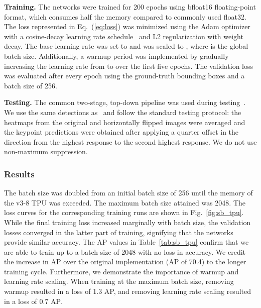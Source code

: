 \documentclass[final]{cvpr}
\begin{document}
\medskip\noindent\textbf{Training.} The networks were trained for 200 epochs using bfloat16 floating-point format, which consumes half the memory compared to commonly used float32. The loss represented in Eq.\ (\ref{eq:loss}) was minimized using the Adam optimizer~\cite{kingma2014adam} with a cosine-decay learning rate schedule~\cite{loshchilov2016sgdr} and L2 regularization with  weight decay. The base learning rate  was set to  and was scaled to , where  is the global batch size. Additionally, a warmup period was implemented by gradually increasing the learning rate from  to  over the first five epochs.  The validation loss was evaluated after every epoch using the ground-truth bounding boxes and a batch size of 256. 

\medskip\noindent\textbf{Testing.} The common two-stage, top-down pipeline was used during testing~\cite{chen2018cascaded, xiao2018simple, sun2019deep}. We use the same detections as~\cite{xiao2018simple, sun2019deep} and follow the standard testing protocol: the heatmaps from the original and horizontally flipped images were averaged and the keypoint predictions were obtained after applying a quarter offset in the direction from the highest response to the second highest response. We do not use non-maximum suppression.

\vspace{-6pt}
\subsubsection{Results} 
\label{sec:sb_tpu}
The batch size was doubled from an initial batch size of 256 until the memory of the v3-8 TPU was exceeded. The maximum batch size attained was 2048. The loss curves for the corresponding training runs are shown in Fig.\ \ref{fig:sb_tpu}. While the final training loss increased marginally with batch size, the validation losses converged in the latter part of training, signifying that the networks provide similar accuracy. The AP values in Table~\ref{tab:sb_tpu} confirm that we are able to train up to a batch size of 2048 with no loss in accuracy. We credit the increase in AP over the original implementation (AP of 70.4) to the longer training cycle. Furthermore, we demonstrate the importance of warmup and learning rate scaling. When training at the maximum batch size, removing warmup resulted in a loss of 1.3 AP, and removing learning rate scaling resulted in a loss of 0.7 AP.
\end{document}
